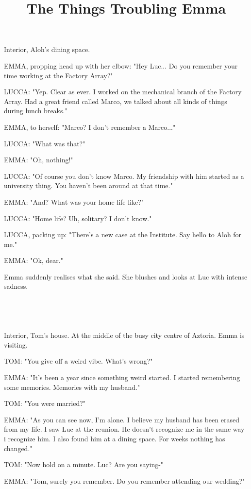 \documentclass[11pt]{article}
\begin{document}
\ttfamily
\title{The Things Troubling Emma}
\maketitle

Interior, Aloh's dining space.

EMMA, propping head up with her elbow: "Hey Luc... Do you remember your time working at the Factory Array?"

LUCCA: "Yep. Clear as ever.
I worked on the mechanical branch of the Factory Array.
Had a great friend called Marco, we talked about all kinds of things during lunch breaks."

EMMA, to herself: "Marco? I don't remember a Marco..."

LUCCA: "What was that?"

EMMA: "Oh, nothing!"

LUCCA: "Of course you don't know Marco.
My friendship with him started as a university thing.
You haven't been around at that time."

EMMA: "And? What was your home life like?"

LUCCA: "Home life? Uh, solitary? I don't know."

LUCCA, packing up: "There's a new case at the Institute.
Say hello to Aloh for me."

EMMA: "Ok, dear."

Emma suddenly realises what she said.
She blushes and looks at Luc with intense sadness.

\ 

\ 

Interior, Tom's house.
At the middle of the busy city centre of Aztoria.
Emma is visiting.

TOM: "You give off a weird vibe. 
What's wrong?"

EMMA: "It's been a year since something weird started.
I started remembering some memories. 
Memories with my husband."

TOM: "You were married?"

EMMA: "As you can see now, I'm alone.
I believe my husband has been erased from my life.
I saw Luc at the reunion.
He doesn't recognize me in the same way i recognize him.
I also found him at a dining space.
For weeks nothing has changed."

TOM: "Now hold on a minute. 
Luc?
Are you saying-"

EMMA: "Tom, surely you remember. 
Do you remember attending our wedding?"
\end{document}

